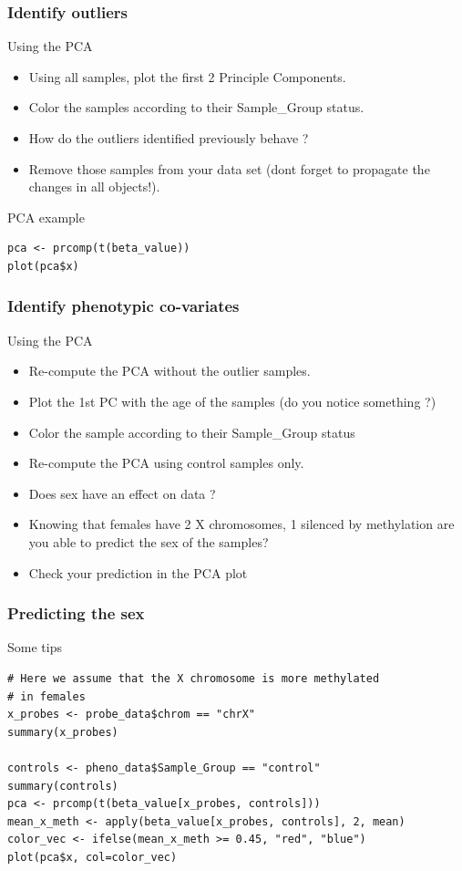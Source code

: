 \documentclass[10pt]{beamer}
\newenvironment{xframe}[2][]
  {\begin{frame}[fragile,environment=xframe,#1]
  \frametitle{#2}}
  {\end{frame}}
\begin{document}
\begin{xframe}{Identify outliers}
  \begin{block}{Using the PCA}
    \begin{itemize}
      \item Using all samples, plot the first 2 Principle Components.
      \item Color the samples according to their Sample\_Group status. 
      \item How do the outliers identified previously behave ?
      \item Remove those samples from your data set (dont forget to propagate
      the changes in all objects!).
    \end{itemize}
  \end{block}
   \begin{exampleblock}{PCA example}
\begin{verbatim}
pca <- prcomp(t(beta_value))
plot(pca$x)
\end{verbatim}  
  \end{exampleblock}
\end{xframe}


\begin{xframe}{Identify phenotypic co-variates}
  \begin{block}{Using the PCA}
    \begin{itemize}
      \item Re-compute the PCA without the outlier samples.
      \item Plot the 1st PC with the age of the samples (do you notice
      something ?)
      \item Color the sample according to their Sample\_Group status
      \item Re-compute the PCA using {\sf control} samples only.
	  \item Does sex have an effect on data ?
	  \item Knowing that females have 2 X chromosomes, 1 silenced by methylation
	  are you able to predict the sex of the samples?
	  \item Check your prediction in the PCA plot
    \end{itemize}
      \end{block}

\end{xframe}

\begin{xframe}{Predicting the sex}
  \begin{exampleblock}{Some tips}
    \begin{verbatim}
# Here we assume that the X chromosome is more methylated
# in females
x_probes <- probe_data$chrom == "chrX"
summary(x_probes)

controls <- pheno_data$Sample_Group == "control"
summary(controls)
pca <- prcomp(t(beta_value[x_probes, controls]))
mean_x_meth <- apply(beta_value[x_probes, controls], 2, mean)
color_vec <- ifelse(mean_x_meth >= 0.45, "red", "blue")
plot(pca$x, col=color_vec)
    \end{verbatim}  
  \end{exampleblock}
\end{xframe}
     
\end{document}
